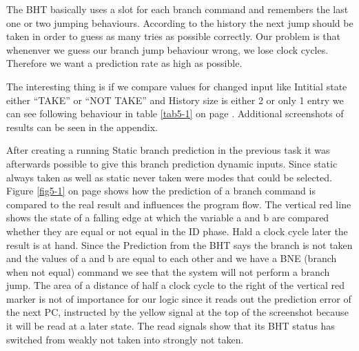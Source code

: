 The BHT basically uses a slot for each branch command and remembers the last one or two jumping behaviours. According to the history the next jump should be taken in order to guess as many tries as possible correctly. Our problem is that whenenver we guess our branch jump behaviour wrong, we lose clock cycles. Therefore we want a prediction rate as high as possible. 

The interesting thing is if we compare values for changed input like Intitial state either ``TAKE'' or ``NOT TAKE'' and History size is either 2 or only 1 entry we can see following behaviour in table \ref{tab5-1} on page \pageref{tab5-1}. Additional screenshots of results can be seen in the appendix.

\begin{table}[h]
\end{table}



After creating a running Static branch prediction in the previous task it was afterwards possible to give this branch prediction dynamic inputs. Since static always taken as well as static never taken were modes that could be selected.  Figure \ref{fig5-1} on page \pageref{fig5-1} shows how the prediction of a branch command is compared to the real result and influences the program flow. The vertical red line shows the state of a falling edge at which the variable a and b are compared whether they are equal or not equal in the ID phase. Hald a clock cycle later the result is at hand. Since the Prediction from the BHT says the branch is not taken and the values of a and b are equal to each other and we have a BNE (branch when not equal) command we see that the system will not perform a branch jump. The area of a distance of half a clock cycle to the right of the vertical red marker is not of importance for our logic since it reads out the prediction error of the next PC, instructed by the yellow signal at the top of the screenshot because it will be read at a later state. The read signals show that its BHT status has switched from weakly not taken into strongly not taken.

